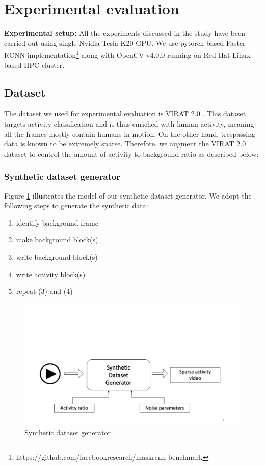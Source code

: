 \section{Experimental evaluation}
\label{sec:exp-eval}
\textbf{Experimental setup:}
All the experiments discussed in the study have been carried out using single Nvidia Tesla K20 GPU. We use pytorch based Faster-RCNN implementation\footnote{https://github.com/facebookresearch/maskrcnn-benchmark} along with OpenCV v4.0.0 running on Red Hat Linux based HPC cluster. 

\subsection{Dataset}
The dataset we used for experimental evaluation is VIRAT 2.0 \cite{virat20}. This dataset targets activity classification and is thus enriched with human activity, meaning all the frames mostly contain humans in motion. On the other hand, trespassing data is known to be extremely sparse. Therefore, we augment the VIRAT 2.0 dataset to control the amount of activity to background ratio as described below: 

\vspace{5pt}
\subsubsection{Synthetic dataset generator}
\label{sec:synthetic-dataset-generator}
Figure \ref{fig:synthetic-dataset-generator} illustrates the model of our synthetic dataset generator. We adopt the following steps to generate the synthetic data: 
\begin{enumerate} 
    \item identify background frame
    \item make background block(s)
    \item write background block(s)
    \item write activity block(s)
    \item repeat (3) and (4)
\end{enumerate}

\begin{figure}
    \centering
    \includegraphics[width=\linewidth,trim={0 50 0 200},clip]{images/synthetic-dataset-generator}
    \caption{Synthetic dataset generator}
    \label{fig:synthetic-dataset-generator}
\end{figure}

